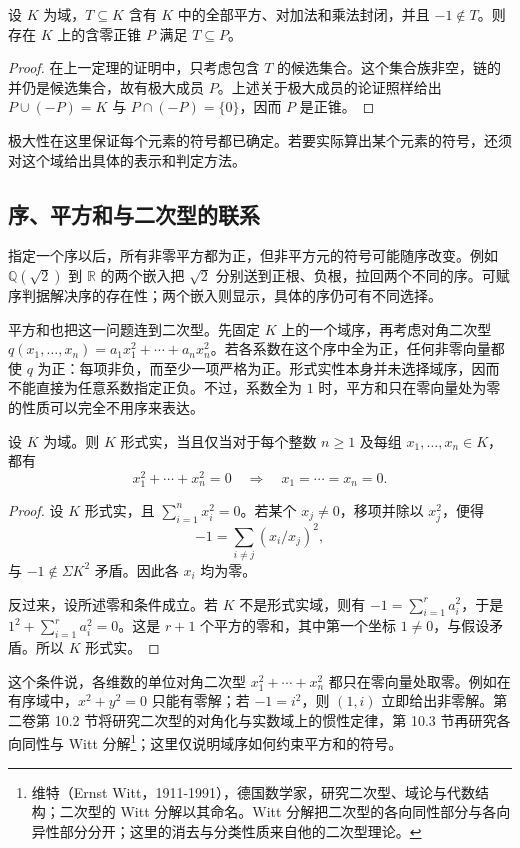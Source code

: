 \begin{corollary}\label{b1:cor:positive-cone-extension}
	设 \(K\) 为域，\(T\subseteq K\) 含有 \(K\) 中的全部平方、对加法和乘法封闭，并且 \(-1\notin T\)。则存在 \(K\) 上的含零正锥 \(P\) 满足 \(T\subseteq P\)。
\end{corollary}

\begin{proof}
	在上一定理的证明中，只考虑包含 \(T\) 的候选集合。这个集合族非空，链的并仍是候选集合，故有极大成员 \(P\)。上述关于极大成员的论证照样给出 \(P\cup(-P)=K\) 与 \(P\cap(-P)=\{0\}\)，因而 \(P\) 是正锥。
\end{proof}

极大性在这里保证每个元素的符号都已确定。若要实际算出某个元素的符号，还须对这个域给出具体的表示和判定方法。

\subsection{序、平方和与二次型的联系}
\label{b1:subsec:E01:03}

指定一个序以后，所有非零平方都为正，但非平方元的符号可能随序改变。例如 \(\mathbb Q(\sqrt2)\) 到 \(\mathbb R\) 的两个嵌入把 \(\sqrt2\) 分别送到正根、负根，拉回两个不同的序。可赋序判据解决序的存在性；两个嵌入则显示，具体的序仍可有不同选择。

\ProseParagraphBreak
平方和也把这一问题连到二次型。先固定 \(K\) 上的一个域序，再考虑对角二次型 \(q(x_1,\ldots,x_n)=a_1x_1^2+\cdots+a_nx_n^2\)。若各系数在这个序中全为正，任何非零向量都使 \(q\) 为正：每项非负，而至少一项严格为正。形式实性本身并未选择域序，因而不能直接为任意系数指定正负。不过，系数全为 \(1\) 时，平方和只在零向量处为零的性质可以完全不用序来表达。

\begin{corollary}\label{b1:cor:E-formally-real-zero-squares}
	设 \(K\) 为域。则 \(K\) 形式实，当且仅当对于每个整数 \(n\geq1\) 及每组 \(x_1,\ldots,x_n\in K\)，都有
	\[
		x_1^2+\cdots+x_n^2=0 \quad\Longrightarrow\quad x_1=\cdots=x_n=0.
	\]
\end{corollary}

\begin{proof}
	设 \(K\) 形式实，且 \(\sum_{i=1}^n x_i^2=0\)。若某个 \(x_j\neq0\)，移项并除以 \(x_j^2\)，便得
	\[
		-1=\sum_{i\neq j}(x_i/x_j)^2,
	\]
	与 \(-1\notin\Sigma K^2\) 矛盾。因此各 \(x_i\) 均为零。

	反过来，设所述零和条件成立。若 \(K\) 不是形式实域，则有 \(-1=\sum_{i=1}^r a_i^2\)，于是 \(1^2+\sum_{i=1}^r a_i^2=0\)。这是 \(r+1\) 个平方的零和，其中第一个坐标 \(1\neq0\)，与假设矛盾。所以 \(K\) 形式实。
\end{proof}

这个条件说，各维数的单位对角二次型 \(x_1^2+\cdots+x_n^2\) 都只在零向量处取零。例如在有序域中，\(x^2+y^2=0\) 只能有零解；若 \(-1=i^2\)，则 \((1,i)\) 立即给出非零解。第二卷第 10.2 节将研究二次型的对角化与实数域上的惯性定律，第 10.3 节再研究各向同性与 Witt 分解\footnote{维特（Ernst Witt，1911-1991），德国数学家，研究二次型、域论与代数结构；二次型的 Witt 分解以其命名。Witt 分解把二次型的各向同性部分与各向异性部分分开；这里的消去与分类性质来自他的二次型理论。}；这里仅说明域序如何约束平方和的符号。
